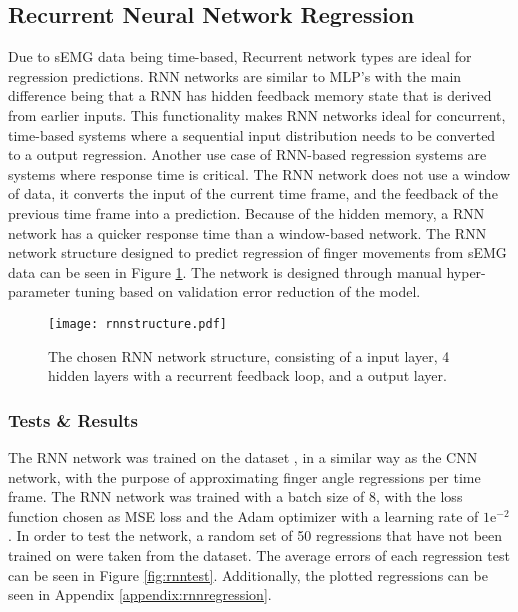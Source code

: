 \documentclass[../main.tex]{subfiles}
\begin{document}
\subsection{Recurrent Neural Network Regression}

Due to sEMG data being time-based, Recurrent network types are ideal for regression predictions.
RNN networks are similar to MLP's with the main difference being that a RNN has hidden feedback  memory state that is derived from earlier inputs.
This functionality makes RNN networks ideal for concurrent, time-based systems where a sequential input distribution needs to be converted to a output regression.  
Another use case of RNN-based regression systems are systems where response time is critical.
The RNN network does not use a window of data, it converts the input of the current time frame, and the feedback of the previous time frame into a prediction.
Because of the hidden memory, a RNN network has a quicker response time than a window-based network.
The RNN network structure designed to predict regression of finger movements from sEMG data can be seen in Figure \ref{fig:rnn_structure}.
The network is designed through manual hyper-parameter tuning based on validation error reduction of the model.



\begin{figure}[H]
\begin{center}
\texttt{[image: rnnstructure.pdf]}
\caption{The chosen RNN network structure, consisting of a input layer, 4 hidden layers with a recurrent feedback loop, and a output layer.}
\label{fig:rnn_structure}
\end{center}
\end{figure}

\subsubsection{Tests \& Results}

The RNN network was trained on the dataset \cite{kinmusdataset}, in a similar way as the CNN network, with the purpose of approximating finger angle regressions per time frame.
The RNN network was trained with a batch size of 8, with the loss function chosen as MSE loss and the Adam optimizer with a learning rate of $1\text{e}^{-2}$.
In order to test the network, a random set of 50 regressions that have not been trained on were taken from the dataset.
The average errors of each regression test can be seen in Figure \ref{fig:rnntest}.
Additionally, the plotted regressions can be seen in Appendix \ref{appendix:rnnregression}.
\end{document}
